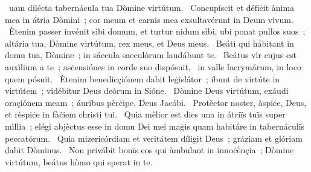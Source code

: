 \psalmChapterWithInscription{}
{ }
{%
~uam dilécta tabernácula tua Dòmine virtútum. 
~Concupíscit et défiċit ànima mea in átria Dòmini~; cor meum et carnis mea exsultavérunt in Deum vivum. 
~Ètenim passer invénit sìbi domum, et turtur nidum sìbi, ubi ponat pullos suos~; altária tua, Dòmine virtútum, rex meus, et Deus meus. 
~Beáti qui hábitant in domu tua, Dòmine~; in sáecula saeculórum laudábunt te. 
~Beátus vìr cujus est auxìlium a te~; asċensiónes in corde suo dispósuit, 
~in valle lacrymárum, in loco quem pósuit. 
~Ètenim benedicçiónem dabit leġislátor~; ibunt de virtúte in virtútem~; vidébitur Deus deórum in Sióne. 
~Dòmine Deus virtútum, exáudi oraçiónem meam~; áuribus pèrċipe, Deus Jacóbi. 
~Protèctor noster, àspiċe, Deus, et rèspiċe in fàċiem christi tui. 
~Quia mèlior est dies una in átriïs tuïs super mìllia~; elégi abjèctus esse in domu Dei mei maġis quam habitáre in tabernáculïs peccatórum. 
~Quia mizericórdiam et veritátem díligit Deus~; gráziam et glóriam dabit Dòminus. 
~Non privábit bonïs eos qui àmbulant in innoċènçia~; Dòmine virtútum, beátus hòmo qui sperat in te. 
}
